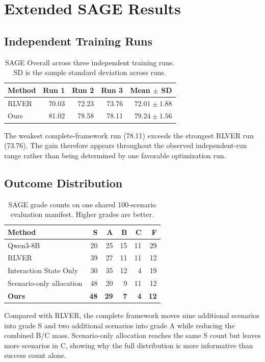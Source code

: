 \section{Extended SAGE Results}
\subsection{Independent Training Runs}
\begin{table}[t]
\centering
\small
\begin{tabular}{lrrrr}
\toprule
Method & Run 1 & Run 2 & Run 3 & Mean $\pm$ SD \\
\midrule
RLVER & 70.03 & 72.23 & 73.76 & $72.01\pm1.88$ \\
Ours & 81.02 & 78.58 & 78.11 & $\mathbf{79.24\pm1.56}$ \\
\bottomrule
\end{tabular}
\caption{SAGE Overall across three independent training runs. SD is the sample
standard deviation across runs.}
\label{tab:supp-independent-runs}
\end{table}

The weakest complete-framework run (78.11) exceeds the strongest RLVER run
(73.76). The gain therefore appears throughout the observed independent-run
range rather than being determined by one favorable optimization run.

\subsection{Outcome Distribution}
\begin{table}[t]
\centering
\small
\begin{tabular}{lrrrrr}
\toprule
Method & S & A & B & C & F \\
\midrule
Qwen3-8B & 20 & 25 & 15 & 11 & 29 \\
RLVER & 39 & 27 & 11 & 11 & 12 \\
Interaction State Only & 30 & 35 & 12 & 4 & 19 \\
Scenario-only allocation & 48 & 20 & 9 & 11 & 12 \\
\textbf{Ours} & \textbf{48} & \textbf{29} & \textbf{7} & \textbf{4} & \textbf{12} \\
\bottomrule
\end{tabular}
\caption{SAGE grade counts on one shared 100-scenario evaluation manifest.
Higher grades are better.}
\label{tab:supp-sage-grades}
\end{table}

Compared with RLVER, the complete framework moves nine additional scenarios
into grade S and two additional scenarios into grade A while reducing the
combined B/C mass. Scenario-only allocation reaches the same S count but leaves
more scenarios in C, showing why the full distribution is more informative
than success count alone.

